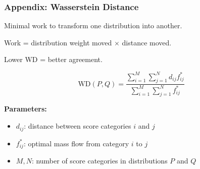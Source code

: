 \documentclass[aspectratio=169]{beamer}
\begin{document}
\begin{frame}
    \frametitle{Appendix: Wasserstein Distance}
    Minimal work to transform one distribution into another.

    Work = distribution weight moved $\times$ distance moved.

    Lower WD = better agreement.

    \begin{equation*}
        \text{WD}(P, Q) = \frac{\sum_{i=1}^M \sum_{j=1}^N d_{ij} f_{ij}^*}{\sum_{i=1}^M \sum_{j=1}^N f_{ij}^*}
    \end{equation*}

    \footnotesize{
        \textbf{Parameters:}
        \begin{itemize}
            \item $d_{ij}$: distance between score categories $i$ and $j$
            \item $f_{ij}^*$: optimal mass flow from category $i$ to $j$
            \item $M, N$: number of score categories in distributions $P$ and $Q$
        \end{itemize}
    }
\end{frame}


%     
\end{document}
